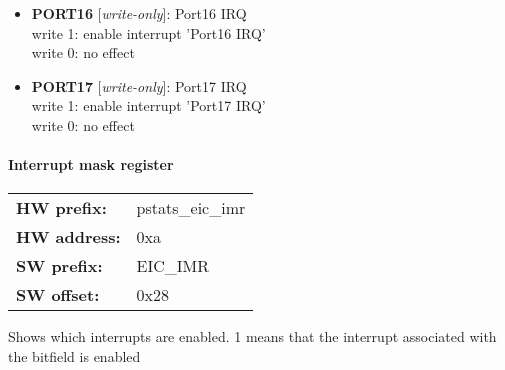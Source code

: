 \begin{itemize}
\begin{small}
{\bf 
PORT15
} [\emph{write-only}]: Port15 IRQ
\\
write 1: enable interrupt 'Port15 IRQ'\\write 0: no effect
\end{small}
\item \begin{small}
{\bf 
PORT16
} [\emph{write-only}]: Port16 IRQ
\\
write 1: enable interrupt 'Port16 IRQ'\\write 0: no effect
\end{small}
\item \begin{small}
{\bf 
PORT17
} [\emph{write-only}]: Port17 IRQ
\\
write 1: enable interrupt 'Port17 IRQ'\\write 0: no effect
\end{small}
\end{itemize}
\paragraph*{Interrupt mask register}\vspace{12pt}

\begin{tabular}{l l }
{\bf HW prefix:}  & pstats\_eic\_imr\\
{\bf HW address:}  & 0xa\\
{\bf SW prefix:}  & EIC\_IMR\\
{\bf SW offset:}  & 0x28\\
\end{tabular}

\vspace{12pt}
Shows which interrupts are enabled. 1 means that the interrupt associated with the bitfield is enabled

